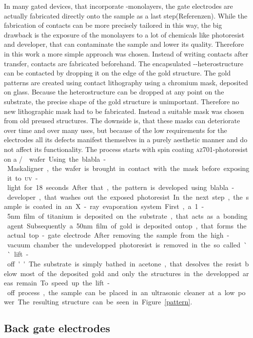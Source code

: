 In many gated devices, that incorporate \tmd-monolayers, the gate electrodes are actually fabricated directly onto the sample as a last step(Referenzen). While the fabrication of contacts can be more precisely tailored in this way, the big drawback is the exposure of the monolayers to a lot of chemicals like photoresist and developer, that can contaminate the sample and lower its quality. Therefore in this work a more simple approach was chosen. Instead of writing contacts after transfer, contacts are fabricated beforehand. The encapsulated \hbn-\tmd-heterostructure can be contacted by dropping it on the edge of the gold structure. The gold patterns are created using contact lithography using a chromium mask, deposited on glass. Because the heterostructure can be dropped at any point on the substrate, the precise shape of the gold structure is unimportant. Therefore no new lithographic mask had to be fabricated. Instead a suitable mask was chosen from old preused structures. The downside is, that these masks can deteriorate over time and over many uses, but because of the low requirements for the electrodes all its defects manifest themselves in a purely aesthetic manner and do not affect its functionality. The process starts with spin coating \textsc{az}701-photoresist on a \si/\sio wafer. Using the blabla-Maskaligner, the wafer is brought in contact with the mask before exposing it to \textsc{uv}-light for 18 seconds. After that, the pattern is developed using blabla-developer, that washes out the exposed photoresist.

In the next step, the sample is coated in an X-ray evaporation system. First, a 1-5nm film of titanium is deposited on the substrate, that acts as a bonding agent. Subsequently a 50nm film of gold is deposited ontop, that forms the actual top-gate electrode. After removing the sample from the high-vacuum chamber the undevelopped photoresist is removed in the so called ``lift-off''. The substrate is simply bathed in acetone, that desolves the resist below most of the deposited gold and only the structures in the developped areas remain. To speed up the lift-off process, the sample can be placed in an ultrasonic cleaner at a low power. The resulting structure can be seen in Figure \ref{pattern}. 

\subsection{Back gate electrodes}

